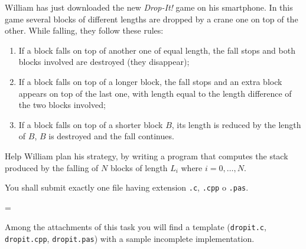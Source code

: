 \usepackage{xcolor}
\usepackage{afterpage}
\usepackage{pifont,mdframed}
\usepackage[bottom]{footmisc}

\makeatletter
\gdef\this@inputfilename{input.txt}
\gdef\this@outputfilename{output.txt}
\makeatother

\newcommand{\inputfile}{\texttt{input.txt}}
\newcommand{\outputfile}{\texttt{output.txt}}

\newenvironment{warning}
  {\par\begin{mdframed}[linewidth=2pt,linecolor=gray]%
    \begin{list}{}{\leftmargin=1cm
                   \labelwidth=\leftmargin}\item[\Large\ding{43}]}
  {\end{list}\end{mdframed}\par}

	William has just downloaded the new \emph{Drop-It!} game on his smartphone. In this game several blocks of different lengths are dropped by a crane one on top of the other. While falling, they follow these rules:
	\begin{enumerate}
		\item If a block falls on top of another one of equal length, the fall stops and both blocks involved are destroyed (they disappear);
		\item If a block falls on top of a longer block, the fall stops and an extra block appears on top of the last one, with length equal to the length difference of the two blocks involved;
		\item If a block falls on top of a shorter block $B$, its length is reduced by the length of $B$, $B$ is destroyed and the fall continues.
	\end{enumerate}
	Help William plan his strategy, by writing a program that computes the stack produced by the falling of $N$ blocks of length $L_i$ where $i=0, \ldots, N$.

\Implementation
You shall submit exactly one file having extension \texttt{.c}, \texttt{.cpp} o \texttt{.pas}.

\begin{warning}
Among the attachments of this task you will find a template (\texttt{dropit.c}, \texttt{dropit.cpp}, \texttt{dropit.pas}) with a sample incomplete implementation.
\end{warning}


